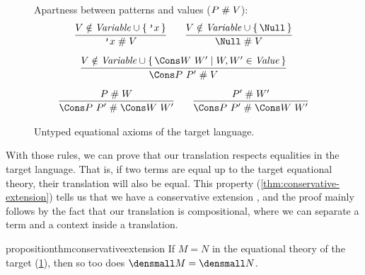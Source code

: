 \begin{figure}

Apartness between patterns and values ($P \mathrel{\#} V$):
\begin{gather*}
  \infer
  {\q{x} \apart V}
  {V \notin \mathit{Variable} \cup \set{\q{x}}}
  \qquad
  \infer
  {\Null \apart V}
  {V \notin \mathit{Variable} \cup \set{\Null}}
  \\[1ex]
  \infer
  {\Cons P ~ P' \apart V}
  {V \notin \mathit{Variable} \cup \set{\Cons W ~ W' \mid W, W' \in \mathit{Value}}}
  \\[1ex]
  \infer
  {\Cons P ~ P' \apart \Cons W ~ W'}
  {P \apart W}
  \qquad
  \infer
  {\Cons P ~ P' \apart \Cons W ~ W'}
  {P' \apart W'}
\end{gather*}

\caption{Untyped equational axioms of the target language.}
\label{fig:target-equality}
\end{figure}

With those rules, we can prove that our translation respects equalities in the target language.
That is, if two terms are equal up to the target equational theory, their translation will also be equal.
This property (\cref{thm:conservative-extension}) tells us that we have a conservative extension \cite{ExpressivePower}, and the proof mainly follows by the fact that our translation is compositional, where we can separate a term and a context inside a translation.


\begin{restatable}{proposition}{thmconservativeextension}
  \label{thm:conservative-extension}
  If $M = N$ in the equational theory of the target
  (\cref{fig:target-equality}), then so too does $\den{M} = \den{N}$.
\end{restatable}

